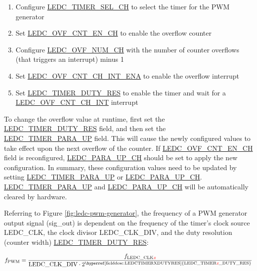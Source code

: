 \documentclass[main\_\_EN.tex]{subfiles}
\begin{document}
 \begin{enumerate}
    \item Configure \hyperref[fielddesc:LEDCTIMERSELCHN]{LEDC\_TIMER\_SEL\_CH} to select the timer for the PWM generator
    \item Set \hyperref[fielddesc:LEDCOVFCNTENCHN]{LEDC\_OVF\_CNT\_EN\_CH} to enable the overflow counter
    \item Configure
    \hyperref[fielddesc:LEDCOVFNUMCHN]{LEDC\_OVF\_NUM\_CH} with the number of counter overflows (that triggers an interrupt) minus 1
    \item Set \hyperref[fielddesc:LEDCOVFCNTCHNINTENA]{LEDC\_OVF\_CNT\_CH\_INT\_ENA} to enable the overflow interrupt
    \item Set \hyperref[fielddesc:LEDCTIMERXDUTYRES]{LEDC\_TIMER\_DUTY\_RES} to enable the timer and wait for a \hyperref[int:ledc-ovf-cnt]{LEDC\_OVF\_CNT\_CH\_INT} interrupt
\end{enumerate}

To change the overflow value at runtime, first set the \hyperref[fielddesc:LEDCTIMERXDUTYRES]{LEDC\_TIMER\_DUTY\_RES} field, and then set the\\ \hyperref[fielddesc:LEDCTIMERXPARAUP]{LEDC\_TIMER\_PARA\_UP} field. This will cause the newly configured values to take effect upon the next overflow of the counter. If \hyperref[fielddesc:LEDCOVFCNTENCHN]{LEDC\_OVF\_CNT\_EN\_CH} field is reconfigured, \hyperref[fielddesc:LEDCPARAUPCHN]{LEDC\_PARA\_UP\_CH} should be set to apply the new configuration. In summary, these configuration values need to be updated by setting \hyperref[fielddesc:LEDCTIMERXPARAUP]{LEDC\_TIMER\_PARA\_UP} or \hyperref[fielddesc:LEDCPARAUPCHN]{LEDC\_PARA\_UP\_CH}. \hyperref[fielddesc:LEDCTIMERXPARAUP]{LEDC\_TIMER\_PARA\_UP} and \hyperref[fielddesc:LEDCPARAUPCHN]{LEDC\_PARA\_UP\_CH} will be automatically cleared by hardware.


Referring to Figure \ref{fig:ledc-pwm-generator}, the frequency of a PWM generator output signal (sig\_out) is dependent on the frequency of the timer's clock source LEDC\_CLK, the clock divisor LEDC\_CLK\_DIV, and the duty resolution (counter width) \hyperref[fielddesc:LEDCTIMERXDUTYRES]{LEDC\_TIMER\_DUTY\_RES}:

    \[
    f_{\textrm{PWM}}=\frac{f_{\textrm{LEDC\_CLK\regindex{x}}}}
                        {\textrm{LEDC\_CLK\_DIV}\cdot 2^{\textrm{\hyperref[fielddesc:LEDCTIMERXDUTYRES]{LEDC\_TIMER\regindex{x}\_DUTY\_RES}}}}
    \]
\end{document}
